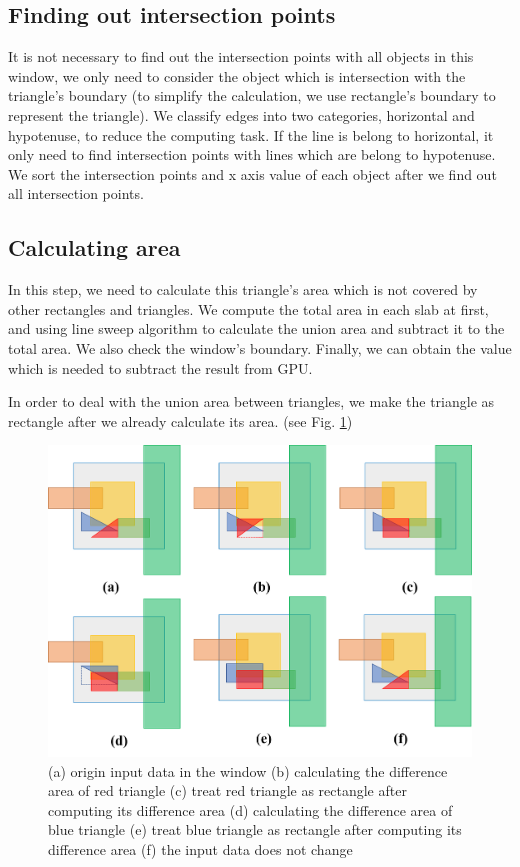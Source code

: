 \subsection{Finding out intersection points}
It is not necessary to find out the intersection points with all objects in this window, we only need to consider the object which is intersection with the triangle's boundary (to simplify the calculation, we use rectangle's boundary to represent the triangle). We classify edges into two categories, horizontal and hypotenuse, to reduce the computing task.  If the line is belong to horizontal, it only need to find intersection points with lines which are belong to hypotenuse. We sort the intersection points and x axis value of each object after we find out all intersection points.

\subsection{Calculating area}
In this step, we need to calculate this triangle's area which is not covered by other rectangles and triangles. We compute the total area in each slab at first, and using line sweep algorithm to calculate the union area and subtract it to the total area. We also check the window's boundary. Finally, we can obtain the value which is needed to subtract the result from GPU.

In order to deal with the union area between triangles, we make the triangle as rectangle after we already calculate its area. (see Fig. \ref{fig:fig_3_7})

\begin{figure}[h]
    \centering
    \includegraphics[scale=0.4]{image/fig_3_7}
    \caption{(a) origin input data in the window
(b) calculating the difference area of red triangle 
(c) treat red triangle as rectangle after computing its difference area
(d) calculating the difference area of blue triangle
(e) treat blue triangle as rectangle after computing its difference area 
(f) the input data does not change
}
    \label{fig:fig_3_7}
\end{figure}